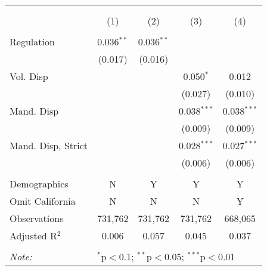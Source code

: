 
\begin{table}[!htbp] \centering 
  \caption{} 
  \label{} 
\begin{tabular}{@{\extracolsep{5pt}}lcccc} 
\\[-1.8ex]\hline 
\hline \\[-1.8ex] 
\\[-1.8ex] & (1) & (2) & (3) & (4)\\ 
\hline \\[-1.8ex] 
 Regulation & 0.036$^{**}$ & 0.036$^{**}$ &  &  \\ 
  & (0.017) & (0.016) &  &  \\ 
  Vol. Disp &  &  & 0.050$^{*}$ & 0.012 \\ 
  &  &  & (0.027) & (0.010) \\ 
  Mand. Disp &  &  & 0.038$^{***}$ & 0.038$^{***}$ \\ 
  &  &  & (0.009) & (0.009) \\ 
  Mand. Disp, Strict &  &  & 0.028$^{***}$ & 0.027$^{***}$ \\ 
  &  &  & (0.006) & (0.006) \\ 
 \hline \\[-1.8ex] 
Demographics & N & Y & Y & Y \\ 
Omit California & N & N & N & Y \\ 
Observations & 731,762 & 731,762 & 731,762 & 668,065 \\ 
Adjusted R$^{2}$ & 0.006 & 0.057 & 0.045 & 0.037 \\ 
\hline 
\hline \\[-1.8ex] 
\textit{Note:}  & \multicolumn{4}{l}{$^{*}$p$<$0.1; $^{**}$p$<$0.05; $^{***}$p$<$0.01} \\ 
\end{tabular} 
\end{table} 
